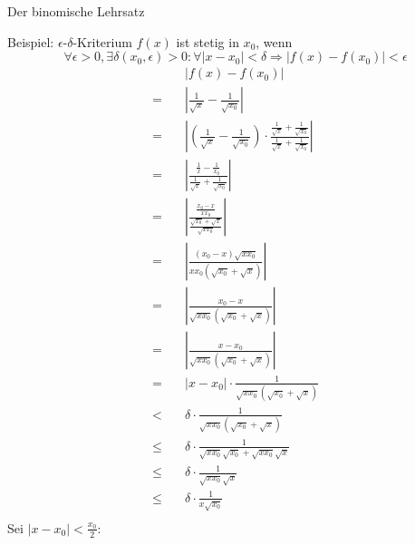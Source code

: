 \documentclass[german]{spicker}
\renewcommand{\abs}[1]{\left| #1 \right|}
\begin{document}
\begin{defi}{Der binomische Lehrsatz}
\begin{bonus}{Beispiel: $\epsilon$-$\delta$-Kriterium}
    $f(x)$ ist stetig in $x_0$, wenn
    $$\forall \epsilon > 0, \exists \delta (x_0, \epsilon) > 0: \forall \abs{x-x_0} < \delta \Rightarrow \abs{f(x)-f(x_0)} < \epsilon$$
    $$
        \begin{aligned}
                       & \abs{f(x)-f(x_0)}                                                                                                                                        \\
            = \quad    & \abs{\frac{1}{\sqrt{x}}-\frac{1}{\sqrt{x_0}}}                                                                                                            \\
            = \quad    & \abs{\left(\frac{1}{\sqrt{x}}-\frac{1}{\sqrt{x_0}}\right) \cdot \frac{\frac{1}{\sqrt{x}}+\frac{1}{\sqrt{x_0}}}{\frac{1}{\sqrt{x}}+\frac{1}{\sqrt{x_0}}}} \\
            = \quad    & \abs{\frac{\frac{1}{x}-\frac{1}{x_0}}{\frac{1}{\sqrt{x}}+\frac{1}{\sqrt{x_0}}}}                                                                          \\
            = \quad    & \abs{\frac{\frac{x_0-x}{x x_0}}{\frac{\sqrt{x_0} + \sqrt{x}}{ \sqrt{x  x_0}}}}                                                                           \\
            = \quad    & \abs{ \frac{(x_0 - x)  \sqrt{x x_0} }{ x x_0  \left( \sqrt{x_0} + \sqrt{x} \right) } }                                                                   \\
            = \quad    & \abs{ \frac{x_0 - x }{ \sqrt{x x_0 } \left( \sqrt{x_0} + \sqrt{x} \right) } }                                                                            \\
            = \quad    & \abs{ \frac{x-x_0 }{ \sqrt{x x_0 } \left( \sqrt{x_0} + \sqrt{x} \right) } }                                                                              \\
            = \quad    & \abs{x-x_0} \cdot \frac{1 }{ \sqrt{x x_0 } \left( \sqrt{x_0} + \sqrt{x} \right) }                                                                        \\
            < \quad    & \delta \cdot \frac{1 }{ \sqrt{x x_0 } \left( \sqrt{x_0} + \sqrt{x} \right) }                                                                             \\
            \leq \quad & \delta \cdot \frac{1 }{ \sqrt{x x_0 } \sqrt{x_0} + \sqrt{x x_0 } \sqrt{x} }                                                                              \\
            \leq \quad & \delta \cdot \frac{1 }{ \sqrt{x x_0 } \sqrt{x} }                                                                                                         \\
            \leq \quad & \delta \cdot \frac{1 }{ x\sqrt{x_0} }                                                                                                                    \\
        \end{aligned}
    $$
    Sei $\abs{x-x_0} < \frac{x_0}{2}$:


\end{bonus}
\end{defi}
\end{document}
